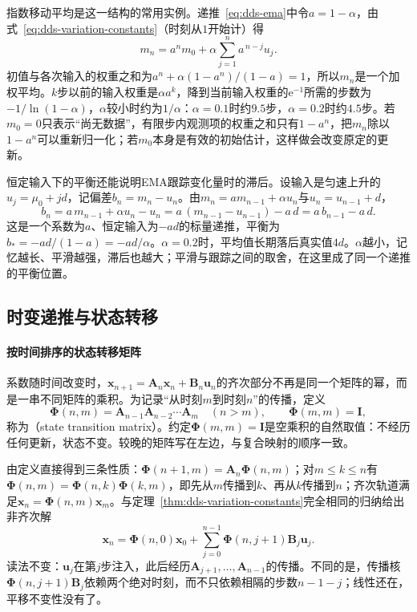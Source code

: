 指数移动平均是这一结构的常用实例。递推~\eqref{eq:dds-ema}中令$a=1-\alpha$，由式~\eqref{eq:dds-variation-constants}（时刻从$1$开始计）得
\begin{equation}
  m_n=a^nm_0+\alpha\sum_{j=1}^na^{\,n-j}u_j .
  \label{eq:dds-ema-expansion}
\end{equation}
初值与各次输入的权重之和为$a^n+\alpha(1-a^n)/(1-a)=1$，所以$m_n$是一个加权平均。$k$步以前的输入权重是$\alpha a^k$，降到当前输入权重的$\mathrm e^{-1}$所需的步数为$-1/\ln(1-\alpha)$，$\alpha$较小时约为$1/\alpha$：$\alpha=0.1$时约$9.5$步，$\alpha=0.2$时约$4.5$步。若$m_0=0$只表示“尚无数据”，有限步内观测项的权重之和只有$1-a^n$，把$m_n$除以$1-a^n$可以重新归一化；若$m_0$本身是有效的初始估计，这样做会改变原定的更新。

恒定输入下的平衡还能说明EMA跟踪变化量时的滞后。设输入是匀速上升的$u_j=\mu_0+jd$，记偏差$b_n=m_n-u_n$。由$m_n=am_{n-1}+\alpha u_n$与$u_n=u_{n-1}+d$，
\[
  b_n=a\,m_{n-1}+\alpha u_n-u_n=a\,(m_{n-1}-u_{n-1})-a\,d=a\,b_{n-1}-a\,d .
\]
这是一个系数为$a$、恒定输入为$-ad$的标量递推，平衡为$b_*=-ad/(1-a)=-ad/\alpha$。$\alpha=0.2$时，平均值长期落后真实值$4d$。$\alpha$越小，记忆越长、平滑越强，滞后也越大；平滑与跟踪之间的取舍，在这里成了同一个递推的平衡位置。

\subsection{时变递推与状态转移}
\label{sec:dds-time-varying}

\paragraph{按时间排序的状态转移矩阵}
系数随时间改变时，$\bm x_{n+1}=\bm A_n\bm x_n+\bm B_n\bm u_n$的齐次部分不再是同一个矩阵的幂，而是一串不同矩阵的乘积。为记录“从时刻$m$到时刻$n$”的传播，定义
\begin{equation}
  \bm\Phi(n,m)=\bm A_{n-1}\bm A_{n-2}\cdots\bm A_m\quad(n>m),\qquad
  \bm\Phi(m,m)=\bm I ,
  \label{eq:dds-transition-matrix}
\end{equation}
称为（state transition matrix）。约定$\bm\Phi(m,m)=\bm I$是空乘积的自然取值：不经历任何更新，状态不变。较晚的矩阵写在左边，与复合映射的顺序一致。

由定义直接得到三条性质：$\bm\Phi(n+1,m)=\bm A_n\bm\Phi(n,m)$；对$m\leq k\leq n$有$\bm\Phi(n,m)=\bm\Phi(n,k)\bm\Phi(k,m)$，即先从$m$传播到$k$、再从$k$传播到$n$；齐次轨道满足$\bm x_n=\bm\Phi(n,m)\bm x_m$。与定理~\ref{thm:dds-variation-constants}完全相同的归纳给出非齐次解
\begin{equation}
  \bm x_n=\bm\Phi(n,0)\bm x_0+\sum_{j=0}^{n-1}\bm\Phi(n,j+1)\bm B_j\bm u_j .
  \label{eq:dds-time-varying-solution}
\end{equation}
读法不变：$\bm u_j$在第$j$步注入，此后经历$\bm A_{j+1},\ldots,\bm A_{n-1}$的传播。不同的是，传播核$\bm\Phi(n,j+1)\bm B_j$依赖两个绝对时刻，而不只依赖相隔的步数$n-1-j$；线性还在，平移不变性没有了。

